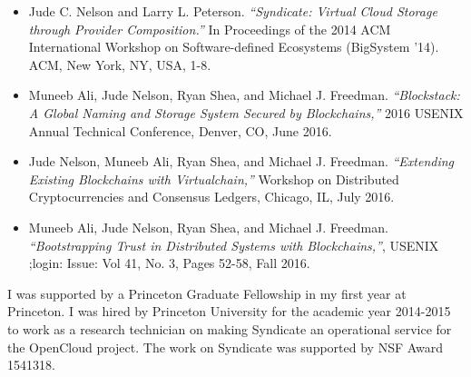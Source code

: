 \begin{itemize}
\item Jude C. Nelson and Larry L. Peterson. \emph{``Syndicate: Virtual Cloud
Storage through Provider Composition.''} In Proceedings of the 2014 ACM
International Workshop on Software-defined Ecosystems (BigSystem '14).
ACM, New York, NY, USA, 1-8.
\item Muneeb Ali, Jude Nelson, Ryan Shea, and Michael J. Freedman.
\emph{``Blockstack: A Global Naming and Storage System Secured by
Blockchains,''} 2016 USENIX Annual Technical Conference, Denver, CO, June 2016.
\item Jude Nelson, Muneeb Ali, Ryan Shea, and Michael J. Freedman.
\emph{``Extending Existing Blockchains with Virtualchain,''} Workshop on
Distributed Cryptocurrencies and Consensus Ledgers, Chicago, IL, July 2016.
\item Muneeb Ali, Jude Nelson, Ryan Shea, and Michael J. Freedman.
\emph{``Bootstrapping Trust in Distributed Systems with Blockchains,''}, USENIX
;login: Issue: Vol 41, No. 3, Pages 52-58, Fall 2016.
\end{itemize}

I was supported by a Princeton Graduate Fellowship in my first year at
Princeton.  I was hired by Princeton University for the academic year 2014-2015
to work as a research technician on making Syndicate an operational service for
the OpenCloud project.  The work on Syndicate was supported by NSF Award 1541318.
